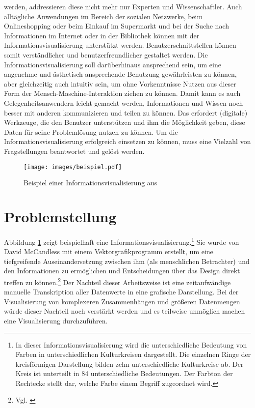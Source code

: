 \documentclass[a4paper, 12pt, DIVcalc, onepage, pdftex, headsepline, footsepline]{scrreprt}
\begin{document}
werden, addressieren diese nicht mehr nur Experten und Wissenschaftler. Auch alltägliche Anwendungen
im Bereich der sozialen Netzwerke, beim Onlineshopping oder beim Einkauf im Supermarkt und bei der Suche nach Informationen
im Internet oder in der Bibliothek können mit der Informationsvisualisierung unterstützt
werden. Benutzerschnittstellen können somit verständlicher und benutzerfreundlicher gestaltet werden.
Die Informationsvisualisierung soll darüberhinaus ansprechend sein, um eine angenehme und ästhetisch ansprechende Benutzung
gewährleisten zu können, aber gleichzeitig auch intuitiv sein, um ohne Vorkenntnisse Nutzen aus
dieser Form der Mensch-Maschine-Interaktion ziehen zu können. Damit kann es auch Gelegenheitsanwendern
leicht gemacht werden, Informationen und
Wissen noch besser mit anderen kommunizieren und teilen zu können. Das erfordert (digitale) Werkzeuge,
die den Benutzer unterstützen und ihm die Möglichkeit geben, diese Daten für seine Problemlösung nutzen zu können.
Um die Informationsvisualisierung erfolgreich einsetzen zu können, muss eine Vielzahl von Fragstellungen
beantwortet und gelöst werden.
\begin{figure}
\centering
\texttt{[image: images/beispiel.pdf]}
\caption{Beispiel einer Informationsvisualisierung aus \citep[S.\,76]{McCandless}}
\label{fig:beispiel}
\end{figure}
\section{Problemstellung}
Abbildung \ref{fig:beispiel} zeigt beispielhaft eine Informationsvisualisierung.\footnote{In dieser
Informationsvisualisierung wird die unterschiedliche Bedeutung von Farben in unterschiedlichen
Kulturkreisen dargestellt. Die einzelnen Ringe der kreisförmigen Darstellung bilden zehn
unterschiedliche Kulturkreise ab. Der Kreis ist unterteilt in 84 unterschiedliche Bedeutungen.
Der Farbton der Rechtecke stellt dar, welche Farbe einem Begriff zugeordnet wird.}
Sie wurde von David McCandless mit einem Vektorgrafikprogramm erstellt, um
eine tiefgreifende Auseinandersetzung zwischen ihm (als menschlichen Betrachter) und den Informationen
zu ermöglichen und Entscheidungen über das Design direkt treffen zu können.\footnote{Vgl. \citep{infoblog}} Der Nachteil dieser
Arbeitsweise ist eine zeitaufwändige manuelle Transkription aller Datenwerte in eine grafische
Darstellung. Bei der Visualisierung von komplexeren Zusammenhängen und größeren Datenmengen würde dieser 
Nachteil noch verstärkt werden und es teilweise unmöglich machen eine Visualisierung durchzuführen.
\end{document}
